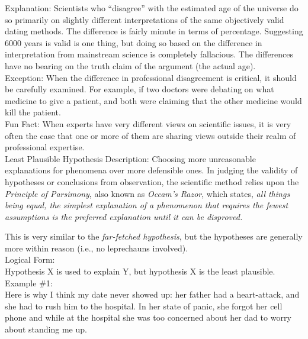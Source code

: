 \documentclass[a4paper,12pt,single,pdftex]{scrbook}
\begin{document}
    
      Explanation: Scientists who “disagree” with the estimated age of the universe do so primarily on slightly different interpretations of the same objectively valid dating methods.  The difference is fairly minute in terms of percentage.  Suggesting 6000 years is valid is one thing, but doing so based on the difference in interpretation from mainstream science is completely fallacious.  The differences have no bearing on the truth claim of the argument (the actual age).
    \\

    
      Exception: When the difference in professional disagreement is critical, it should be carefully examined. For example, if two doctors were debating on what medicine to give a patient, and both were claiming that the other medicine would kill the patient.
    \\

    
      Fun Fact: When experts have very different views on scientific issues, it is very often the case that one or more of them are sharing views outside their realm of professional expertise.
    \\

  

Least Plausible Hypothesis
    Description: Choosing more unreasonable explanations for phenomena over more defensible ones.  In judging the validity of hypotheses or conclusions from observation, the scientific method relies upon the {\it Principle of Parsimony}, also known as {\it Occam’s Razor}, which states, {\it all things being equal, the simplest explanation of a phenomenon that requires the fewest assumptions is the preferred explanation until it can be disproved.  }

    
      This is very similar to the {\it far-fetched hypothesis}, but the hypotheses are generally more within reason (i.e., no leprechauns involved).
    \\

    
      Logical Form:
    \\

    
      Hypothesis X is used to explain Y, but hypothesis X is the least plausible.
    \\

    
      Example \#1:
    \\

    
      Here is why I think my date never showed up: her father had a heart-attack, and she had to rush him to the hospital.  In her state of panic, she forgot her cell phone and while at the hospital she was too concerned about her dad to worry about standing me up.
    \\
\end{document}
